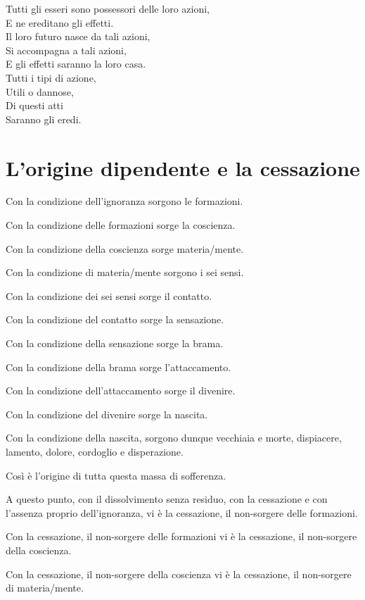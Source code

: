 Tutti gli esseri sono possessori delle loro azioni, \\
E ne ereditano gli effetti. \\
Il loro futuro nasce da tali azioni, \\
Si accompagna a tali azioni, \\
E gli effetti saranno la loro casa. \\
Tutti i tipi di azione, \\
Utili o dannose, \\
Di questi atti \\
Saranno gli eredi.

\section{L'origine dipendente e la cessazione}
\vspace*{-1em}\noindent{}

Con la condizione dell'ignoranza sorgono le formazioni.

Con la condizione delle formazioni sorge la coscienza.

Con la condizione della coscienza sorge materia/mente.

Con la condizione di materia/mente sorgono i sei sensi.

Con la condizione dei sei sensi sorge il contatto.

Con la condizione del contatto sorge la sensazione.

Con la condizione della sensazione sorge la brama.

Con la condizione della brama sorge l'attaccamento.

Con la condizione dell'attaccamento sorge il divenire.

Con la condizione del divenire sorge la nascita.

Con la condizione della nascita, sorgono dunque vecchiaia e morte, dispiacere, lamento, dolore, cordoglio e disperazione.

Così è l'origine di tutta questa massa di sofferenza.

A questo punto, con il dissolvimento senza residuo, con la cessazione e con l'assenza proprio dell'ignoranza, vi è la cessazione, il non-sorgere delle formazioni.

Con la cessazione, il non-sorgere delle formazioni vi è la cessazione, il non-sorgere della coscienza.

Con la cessazione, il non-sorgere della coscienza vi è la cessazione, il non-sorgere di materia/mente.

